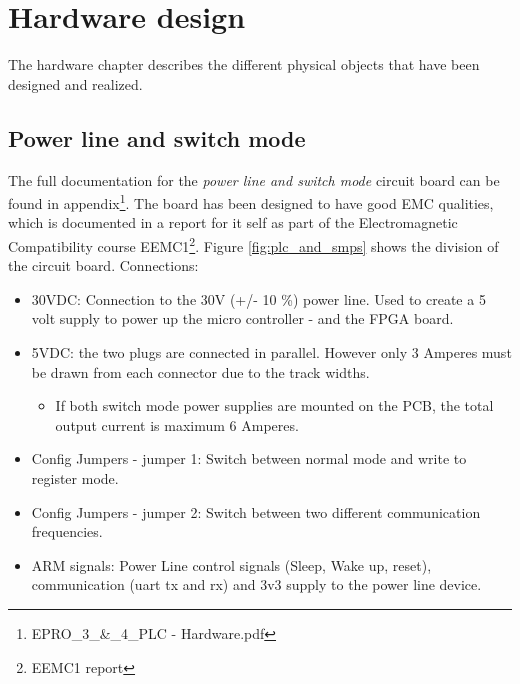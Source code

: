 \chapter{Hardware design}
The hardware chapter describes the different physical objects that have been designed and realized. 
\section{Power line and switch mode}
%
The full documentation for the \textit{power line and switch mode} circuit board can be found in appendix\footnote{EPRO\_3\_\&\_4\_PLC - Hardware.pdf}. The board has been designed to have good EMC qualities, which is documented in a report for it self as part of the Electromagnetic Compatibility course EEMC1\footnote{EEMC1 report}.
\p Figure \ref{fig:plc_and_smps} shows the division of the circuit board.
\p Connections:
\begin{itemize}
	\item 30VDC: Connection to the 30V (+/- 10 \%) power line. Used to create a 5 volt supply to power up the micro controller - and the FPGA board.
	\item 5VDC: the two plugs are connected in parallel. However only 3 Amperes must be drawn from each connector due to the track widths.
	\begin{itemize}
		\item If both switch mode power supplies are mounted on the PCB, the total output current is maximum 6 Amperes.
	\end{itemize}
	\item Config Jumpers - jumper 1: Switch between normal mode and write to register mode.
	\item Config Jumpers - jumper 2: Switch between two different communication frequencies.
	\item ARM signals: Power Line control signals (Sleep, Wake up, reset), communication (uart tx and rx) and 3v3 supply to the power line device.
\end{itemize}

